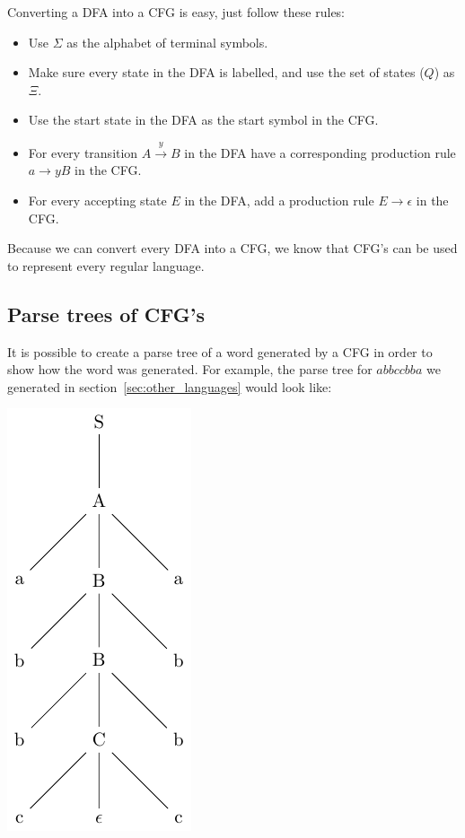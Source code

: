 Converting a DFA into a CFG is easy, just follow these rules:

\begin{itemize}
	\item Use $\Sigma$ as the alphabet of terminal symbols.
	\item Make sure every state in the DFA is labelled, and use the set of states
		($Q$) as $\Xi$.
	\item Use the start state in the DFA as the start symbol in the CFG.
	\item For every transition $A \xrightarrow{y} B$ in the DFA have a
		corresponding production rule $a \rightarrow yB$ in the CFG.
	\item For every accepting state $E$ in the DFA, add a production rule $E
		\rightarrow \epsilon$ in the CFG.
\end{itemize}

Because we can convert every DFA into a CFG, we know that CFG's can be used to
represent every regular language.


\subsection{Parse trees of CFG's}

It is possible to create a parse tree of a word generated by a CFG in order to
show how the word was generated. For example, the parse tree for $abbccbba$ we
generated in section~\ref{sec:other_languages} would look like:

\begin{center}
  \includegraphics{parse_trees/1.pdf}
\end{center}

